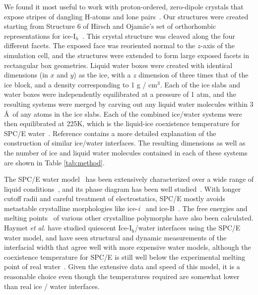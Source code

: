 \documentclass[aps,jcp,preprint,showpacs,superscriptaddress,groupedaddress]{revtex4}  %
\begin{document}
We found it most useful to work with proton-ordered, zero-dipole
crystals that expose stripes of dangling H-atoms and lone
pairs~\cite{Buch:2008fk}.  Our structures were created starting from
Structure 6 of Hirsch and Ojam\"{a}e's set of orthorhombic
representations for ice-I$_{h}$~\cite{Hirsch04}.  This crystal
structure was cleaved along the four different facets.  The exposed
face was reoriented normal to the $z$-axis of the simulation cell, and
the structures were extended to form large exposed facets in
rectangular box geometries.  Liquid water boxes were created with
identical dimensions (in $x$ and $y$) as the ice, with a $z$ dimension
of three times that of the ice block, and a density corresponding to 1
g / cm$^3$.  Each of the ice slabs and water boxes were independently
equilibrated at a pressure of 1 atm, and the resulting systems were
merged by carving out any liquid water molecules within 3 \AA\ of any
atoms in the ice slabs.  Each of the combined ice/water systems were
then equilibrated at 225K, which is the liquid-ice coexistence
temperature for SPC/E water~\cite{Bryk02}. Reference
\citealp{Louden13} contains a more detailed explanation of the
construction of similar ice/water interfaces. The resulting dimensions
as well as the number of ice and liquid water molecules contained in
each of these systems are shown in Table \ref{tab:method}.

The SPC/E water model~\cite{Berendsen87} has been extensively
characterized over a wide range of liquid
conditions~\cite{Arbuckle02,Kuang12}, and its phase diagram has been
well studied~\cite{Baez95,Bryk04b,Sanz04b,Fennell:2005fk}. With longer
cutoff radii and careful treatment of electrostatics, SPC/E mostly
avoids metastable crystalline morphologies like
ice-\textit{i}~\cite{Fennell:2005fk} and ice-B~\cite{Baez95}.  The
free energies and melting
points~\cite{Baez95,Arbuckle02,Gay02,Bryk02,Bryk04b,Sanz04b,Fennell:2005fk,Fernandez06,Abascal07,Vrbka07}
of various other crystalline polymorphs have also been calculated.
Haymet \textit{et al.} have studied quiescent Ice-I$_\mathrm{h}$/water
interfaces using the SPC/E water model, and have seen structural and
dynamic measurements of the interfacial width that agree well with
more expensive water models, although the coexistence temperature for
SPC/E is still well below the experimental melting point of real
water~\cite{Bryk02}. Given the extensive data and speed of this model,
it is a reasonable choice even though the temperatures required are
somewhat lower than real ice / water interfaces.
\end{document}
